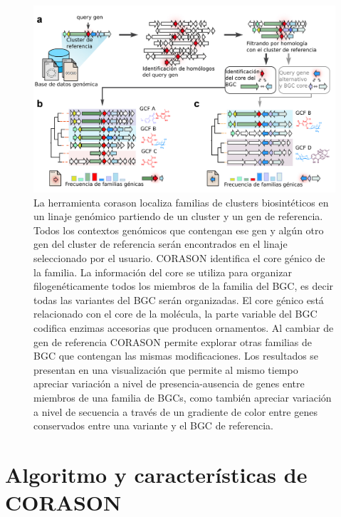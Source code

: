 \documentclass[12pt,twoside]{reedthesis}
\begin{document}
  \begin{figure}[h!tbp]
  \centering
  \includegraphics[angle = 0,scale = .6]{chapter3/Corason-pipe.pdf}
  \caption[La herramienta corason localiza familias de clusters biosintéticos en un linaje genómico partiendo de un cluster y un gen de referencia.]{\footnotesize{La herramienta corason localiza familias de clusters biosintéticos en un linaje genómico partiendo de un cluster y un gen de referencia. Todos los contextos genómicos que contengan ese gen y algún otro gen del cluster de referencia serán encontrados en el linaje seleccionado por el usuario. CORASON identifica el core génico de la familia. La información del core se utiliza para organizar filogenéticamente todos los miembros de la familia del BGC, es decir todas las variantes del BGC serán organizadas. El core génico está relacionado con el core de la molécula, la parte variable del BGC codifica enzimas accesorias que producen ornamentos. Al cambiar de gen de referencia CORASON permite explorar otras familias de BGC que contengan las mismas modificaciones. Los resultados se presentan en una visualización que permite al mismo tiempo apreciar variación a nivel de presencia-ausencia de genes entre miembros de una familia de BGCs, como también apreciar variación a nivel de secuencia a través de un gradiente de color entre genes conservados entre una variante y el BGC de referencia.}}
  \label{fig:Corason-pipe}
  \end{figure}
  
  \section{Algoritmo y características de
  CORASON}\label{algoritmo-y-caracteristicas-de-corason}
  
\end{document}
